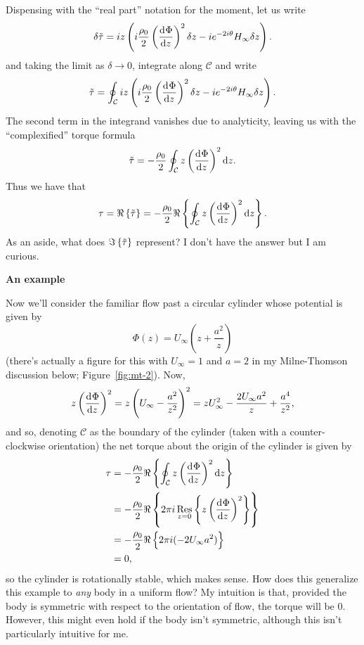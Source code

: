 \documentclass{article}
\DeclareMathOperator*{\res}{Res}
\newcommand{\fC}{\mathcal{C}} %
\newcommand{\dz}{\delta z}
\newcommand{\titau}{\tilde{\tau}}
\newcommand{\tidtau}{\delta \tilde{\tau}}
\begin{document}
%
Dispensing with the ``real part'' notation for the moment, let us write
%
\begin{equation*}
    \tidtau =
        i z \del{i \frac{\rho_0}{2} \del{\dod{\Phi}{z}}^2 \dz
        - i e^{- 2 i \theta} H_\infty \dz}
    .
\end{equation*}
%
and taking the limit as $\delta \to 0$, integrate along $\fC$ and write
%
\begin{equation*}
    \titau =
        \oint_\fC
        i z \del{i \frac{\rho_0}{2} \del{\dod{\Phi}{z}}^2 \dz
        - i e^{- 2 i \theta} H_\infty \dz}
    .
\end{equation*}
%
The second term in the integrand vanishes due to analyticity, leaving us
with the ``complexified'' torque formula
%
\begin{equation*}
    \titau =
    - \frac{\rho_0}{2} \oint_\fC z \del{\dod{\Phi}{z}}^2 \dif z
    .
\end{equation*}
%
Thus we have that
%
\begin{equation*}
    \tau = \Re \cbr{\titau} =
    - \frac{\rho_0}{2} \Re \cbr{\oint_\fC z \del{\dod{\Phi}{z}}^2 \dif z}
    .
\end{equation*}
%
As an aside, what does $\Im \cbr{\titau}$ represent? I don't have the
answer but I am curious.

\textbf{An example}

Now we'll consider the familiar flow past a circular cylinder whose
potential is given by
%
\begin{equation*}
    \Phi(z) = U_\infty (z + \frac{a^2}{z})
\end{equation*}
%
(there's actually a figure for this with $U_\infty = 1$ and $a = 2$ in
my Milne-Thomson discussion below; Figure~\ref{fig:mt-2}). Now,
%
\begin{equation*}
    z \del{\dod{\Phi}{z}}^2
        = z \del{U_\infty - \frac{a^2}{z^2}}^2
        = z U_\infty^2 - \frac{2 U_\infty a^2}{z} + \frac{a^4}{z^2}
    ,
\end{equation*}
%
and so, denoting $\fC$ as the boundary of the cylinder (taken with a
counter-clockwise orientation) the net torque about the origin of the
cylinder is given by
%
\begin{align*}
    \tau
        &= - \frac{\rho_0}{2} \Re \cbr{\oint_\fC z \del{\dod{\Phi}{z}}^2 \dif z} \\
        &= - \frac{\rho_0}{2} \Re \cbr{2 \pi i\res_{z = 0} \cbr{z \del{\dod{\Phi}{z}}^2}} \\
        &= - \frac{\rho_0}{2} \Re \cbr{2 \pi i (-2 U_\infty a^2)} \\
        &= 0
     ,
\end{align*}
%
so the cylinder is rotationally stable, which makes sense. How does this
generalize this example to \textit{any} body in a uniform flow? My
intuition is that, provided the body is symmetric with respect to the
orientation of flow, the torque will be $0$. However, this might even
hold if the body isn't symmetric, although this isn't particularly
intuitive for me.
\end{document}
